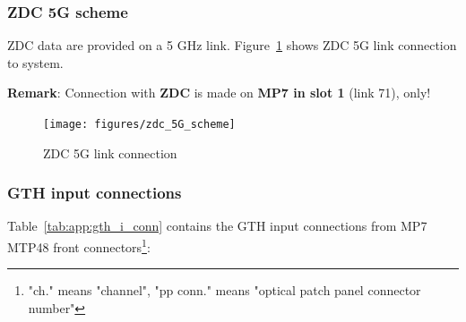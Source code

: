 \subsubsection{ZDC 5G scheme}\label{sec:app:zdc_5g_scheme}

ZDC data are provided on a 5 GHz link.
Figure~\ref{fig:app:zdc_5G_scheme} shows ZDC 5G link connection to \ugt system. 

\textbf{Remark}: Connection with \textbf{ZDC} is made on \textbf{MP7 in slot 1} (link 71), only!\\

\begin{figure}[htb]
\centering
\texttt{[image: figures/zdc\_5G\_scheme]}
\caption{ZDC 5G link connection}
\label{fig:app:zdc_5G_scheme}
\end{figure}

\clearpage

\subsubsection{GTH input connections}\label{sec:app:gth_i_conn}

Table~\ref{tab:app:gth_i_conn} contains the GTH input connections from MP7 MTP48 front connectors\footnote{"ch." means "channel", "pp conn." means "optical patch panel connector number"}:


